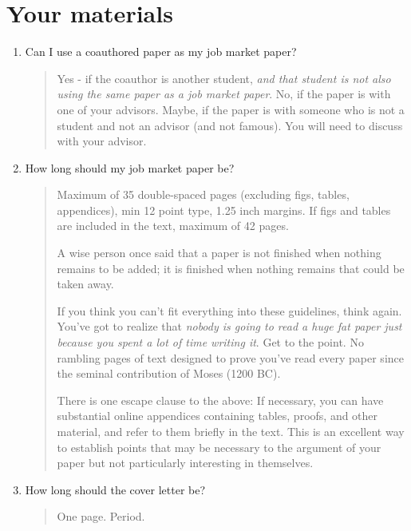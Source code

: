 \documentclass{\classes/econtex}
\begin{document}
\section*{Your materials}

\begin{enumerate}
\item  Can I use a coauthored paper as my job market paper?

  \begin{quote}
    Yes - if the coauthor is another student, \textit{and that student is not
    also using the same paper as a job market paper}.  No, if the paper is with one of your
    advisors.  Maybe, if the paper is with someone who is not a student
    and not an advisor (and not famous).  You will need to discuss with your advisor.
    \hypertarget{Where-Should-I-Look-for-Jobs}{}

  \end{quote}

\item  How long should my job market paper be?

  \begin{quote}
    Maximum of 35 double-spaced pages (excluding figs, tables,
    appendices), min 12 point type, 1.25 inch margins.  If figs and
    tables are included in the text, maximum of 42 pages.   
    
    A wise person once said that a paper is not finished when nothing
    remains to be added; it is finished when nothing remains that could
    be taken away.
    
    If you think you can't fit everything into these guidelines, think
    again.  You've got to realize that \textit{nobody is going to read a
      huge fat paper just because you spent a lot of time writing it}.
    Get to the point.  No rambling pages of text designed to prove you've
    read every paper since the seminal contribution of Moses (1200 BC).

    There is one escape clause to the above: If necessary, you can have
    substantial online appendices containing tables, proofs, and other material, and
    refer to them briefly in the text.  This is an excellent way to
    establish points that may be necessary to the argument of your paper
    but not particularly interesting in themselves.   

  \end{quote}

\item  How long should the cover letter be?
  \begin{quote}
    One page.  Period.


\end{quote}
\end{enumerate}
\end{document}
